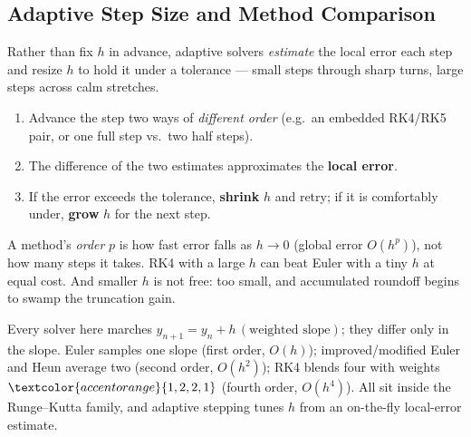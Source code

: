 \subsection{Adaptive Step Size and Method Comparison}

Rather than fix $h$ in advance, adaptive solvers \emph{estimate} the local error
each step and resize $h$ to hold it under a tolerance --- small steps through
sharp turns, large steps across calm stretches.

\begin{methodbox}
\begin{enumerate}[leftmargin=1.6em, itemsep=2pt]
    \item Advance the step two ways of \emph{different order} (e.g.\ an embedded
          RK4/RK5 pair, or one full step vs.\ two half steps).
    \item The difference of the two estimates approximates the \textbf{local
          error}.
    \item If the error exceeds the tolerance, \textbf{shrink} $h$ and retry; if it
          is comfortably under, \textbf{grow} $h$ for the next step.
\end{enumerate}
\end{methodbox}

\begin{warningbox}
A method's \emph{order} $p$ is how fast error falls as $h\to 0$ (global error
$O(h^{p})$), not how many steps it takes. RK4 with a large $h$ can beat Euler with
a tiny $h$ at equal cost. And smaller $h$ is not free: too small, and accumulated
roundoff begins to swamp the truncation gain.
\end{warningbox}

\begin{conceptbox}
Every solver here marches $y_{n+1}=y_n+h\,(\text{weighted slope})$; they differ
only in the slope. \textcolor{accentorange}{Euler} samples one slope (first order,
$O(h)$); \textcolor{accentorange}{improved/modified Euler and Heun} average two
(second order, $O(h^{2})$); \textcolor{accentorange}{RK4} blends four with weights
$\textcolor{accentorange}{1,2,2,1}$ (fourth order, $O(h^{4})$). All sit inside the
\textcolor{accentorange}{Runge--Kutta family}, and \textcolor{accentorange}{adaptive
stepping} tunes $h$ from an on-the-fly local-error estimate.
\end{conceptbox}

\clearpage
{}
{}

